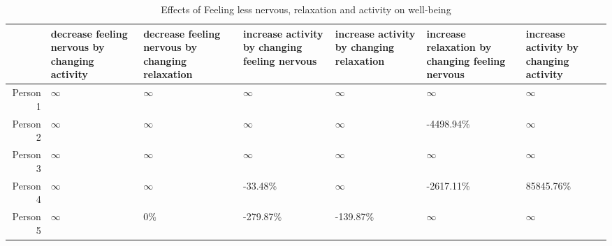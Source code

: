 \begin{table*}[ht]
\centering
\begin{tabular}{rllllll}
  \toprule
 & decrease feeling nervous by changing activity & decrease feeling nervous by changing relaxation & increase activity by changing feeling nervous & increase activity by changing relaxation & increase relaxation by changing feeling nervous  & increase activity by changing activity \\ 
  \midrule
Person 1 & $\infty$ & $\infty$ & $\infty$ & $\infty$ & $\infty$ & $\infty$ \\ 
  Person 2 & $\infty$ & $\infty$ & $\infty$ & $\infty$ & -4498.94\% & $\infty$ \\ 
  Person 3 & $\infty$ & $\infty$ & $\infty$ & $\infty$ & $\infty$ & $\infty$ \\ 
  Person 4 & $\infty$ & $\infty$ & -33.48\% & $\infty$ & -2617.11\% & 85845.76\% \\ 
  Person 5 & $\infty$ & 0\% & -279.87\% & -139.87\% & $\infty$ & $\infty$ \\ 
   \bottomrule
\end{tabular}
\caption{Effects of Feeling less nervous, relaxation and activity on well-being} 
\label{tab:percentage_effects_in_aira}
\end{table*}
